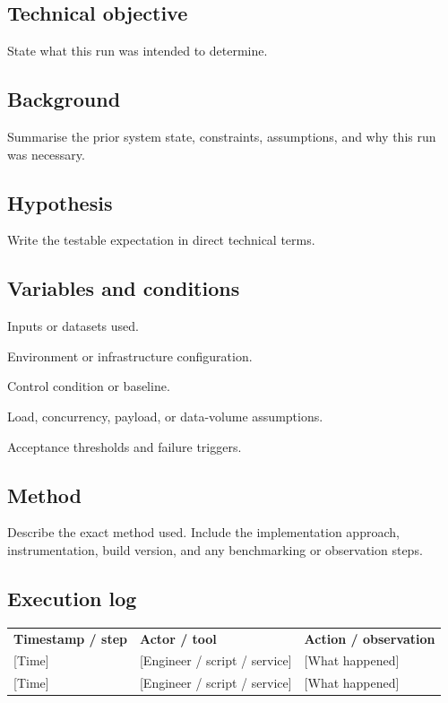 \documentclass[11pt]{article}
\begin{document}
\subsection{Technical objective}
State what this run was intended to determine.

\subsection{Background}
\RaggedRight
Summarise the prior system state, constraints, assumptions, and why this run was necessary.\par
\justifying

\subsection{Hypothesis}
Write the testable expectation in direct technical terms.

\subsection{Variables and conditions}
\begin{RDChecklist}
\item Inputs or datasets used.
\item Environment or infrastructure configuration.
\item Control condition or baseline.
\item Load, concurrency, payload, or data-volume assumptions.
\item Acceptance thresholds and failure triggers.
\end{RDChecklist}

\subsection{Method}
Describe the exact method used. Include the implementation approach, instrumentation, build version, and any benchmarking or observation steps.

\subsection{Execution log}
\begin{xltabular}{\textwidth}{L{2.4cm}L{2.4cm}Y}
\textbf{Timestamp / step} & \textbf{Actor / tool} & \textbf{Action / observation} \\
{[Time]} & {[Engineer / script / service]} & {[What happened]} \\
{[Time]} & {[Engineer / script / service]} & {[What happened]} \\
\end{xltabular}
\end{document}
